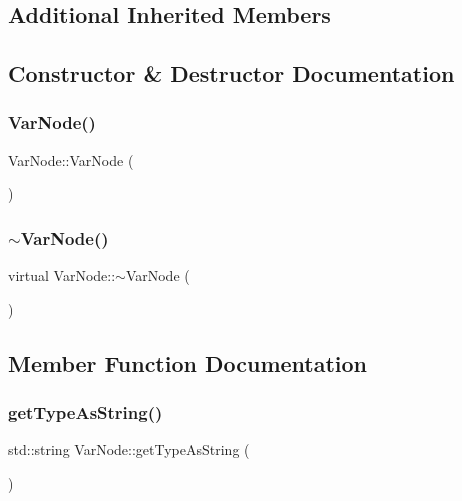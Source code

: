 \subsection*{Additional Inherited Members}


\subsection{Constructor \& Destructor Documentation}
\mbox{\label{classVarNode_a86b94143b89fc73a69cafb025415689f}} 
\subsubsection{\texorpdfstring{Var\+Node()}{VarNode()}}
{\footnotesize\ttfamily Var\+Node\+::\+Var\+Node (\begin{DoxyParamCaption}{ }\end{DoxyParamCaption})}

\mbox{\label{classVarNode_aab6e763704273c00cd756edbdd0b13df}} 
\subsubsection{\texorpdfstring{$\sim$\+Var\+Node()}{~VarNode()}}
{\footnotesize\ttfamily virtual Var\+Node\+::$\sim$\+Var\+Node (\begin{DoxyParamCaption}{ }\end{DoxyParamCaption})\hspace{0.3cm}{\ttfamily [virtual]}}



\subsection{Member Function Documentation}
\mbox{\label{classVarNode_afcde838758181438e89f8f91699c9d5b}} 
\subsubsection{\texorpdfstring{get\+Type\+As\+String()}{getTypeAsString()}}
{\footnotesize\ttfamily std\+::string Var\+Node\+::get\+Type\+As\+String (\begin{DoxyParamCaption}{ }\end{DoxyParamCaption})}

